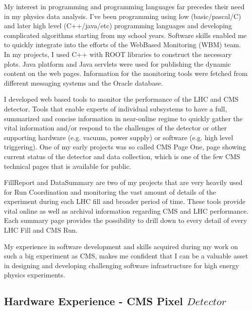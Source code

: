 \documentclass[a4paper]{article}
\begin{document}
My interest in programming and programming languages far precedes their need in my physics data analysis. I’ve been programming using low (basic/pascal/C) and later high level (C++/java/etc) programming languages and developing complicated algorithms starting from my school years. Software skills enabled me to quickly integrate into the efforts of the WebBased Monitoring (WBM) team. In my projects, I used C++ with ROOT libraries to construct the necessary plots. Java platform and Java servlets were used for publishing the dynamic content on the web pages. Information for the monitoring tools were fetched from different messaging systems and the Oracle database.

I developed web based tools to monitor the performance of the LHC and CMS detector. Tools that enable experts of individual subsystems to have a full, summarized and concise information in near-online regime to quickly gather the vital information and/or respond to the challenges of the detector or other supporting hardware (e.g. vacuum, power supply) or software (e.g. high level triggering). One of my early projects was so called CMS Page One, page showing current status of the detector and data collection, which is one of the few CMS technical pages that is available for public.

FillReport and DataSummary are two of my projects that are very heavily used for Run Coordination and monitoring the vast amount of details of the experiment during each LHC fill and broader period of time. These tools provide vital online as well as archival information regarding CMS and LHC performance. Each summary page provides the possibility to drill down to every detail of every LHC Fill and CMS Run.

My experience in software development and skills acquired during my work on such a big experiment as CMS, makes me confident that I can be a valuable asset in designing and developing challenging software infrastructure for high energy physics experiments.

\subsection{Hardware Experience - CMS Pixel $Detector$}
\end{document}
